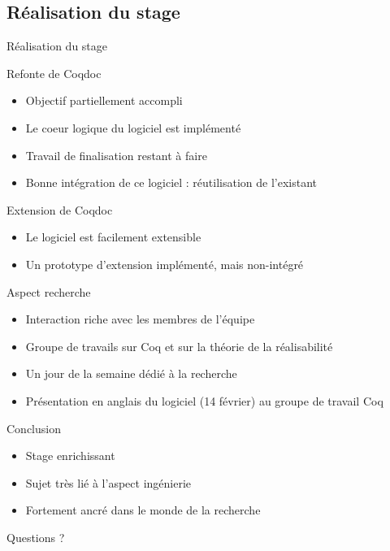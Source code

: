\documentclass[compress]{beamer}
\newenvironment{tframe}[1]{
  \subsection{#1}
  \begin{frame}{#1}
  }{
  \end{frame}
  }
\begin{document}
\begin{tframe}{Réalisation du stage}
  \begin{block}{Refonte de Coqdoc}
    \begin{itemize}
  \item Objectif partiellement accompli
  \item Le coeur logique du logiciel est implémenté
  \item Travail de finalisation restant à faire
  \item Bonne intégration de ce logiciel : réutilisation de l'existant
\end{itemize}
  \end{block}
  \begin{block}{Extension de Coqdoc}
    \begin{itemize}
      \item Le logiciel est facilement extensible
      \item Un prototype d'extension implémenté, mais non-intégré
    \end{itemize}
  \end{block}
\end{tframe}

\begin{frame}{Aspect recherche}
    \begin{itemize}
      \item Interaction riche avec les membres de l'équipe
      \item Groupe de travails sur Coq et sur la théorie de la réalisabilité
      \item Un jour de la semaine dédié à la recherche
      \item Présentation en anglais du logiciel (14 février) au groupe de travail
        Coq
    \end{itemize}
\end{frame}

\begin{frame}{Conclusion}
  \begin{itemize}
    \item Stage enrichissant
    \item Sujet très lié à l'aspect ingénierie
    \item Fortement ancré dans le monde de la recherche
  \end{itemize}
    \vfill
  \begin{center} \large Questions ? \end{center}
\end{frame}
\end{document}
